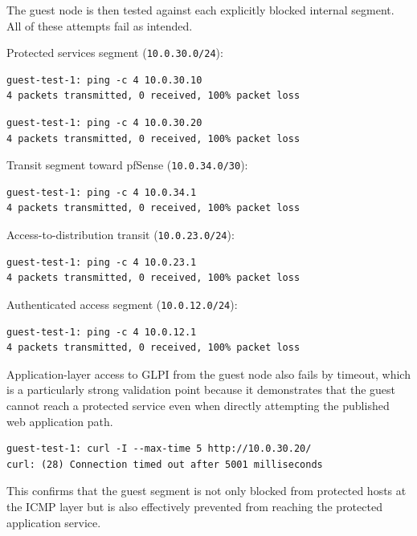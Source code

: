 \documentclass[11pt]{article}
\begin{document}
The guest node is then tested against each explicitly blocked internal segment. All of these attempts fail as intended.

Protected services segment (\texttt{10.0.30.0/24}):

\begin{verbatim}
guest-test-1: ping -c 4 10.0.30.10
4 packets transmitted, 0 received, 100% packet loss
\end{verbatim}

\begin{verbatim}
guest-test-1: ping -c 4 10.0.30.20
4 packets transmitted, 0 received, 100% packet loss
\end{verbatim}

Transit segment toward pfSense (\texttt{10.0.34.0/30}):

\begin{verbatim}
guest-test-1: ping -c 4 10.0.34.1
4 packets transmitted, 0 received, 100% packet loss
\end{verbatim}

Access-to-distribution transit (\texttt{10.0.23.0/24}):

\begin{verbatim}
guest-test-1: ping -c 4 10.0.23.1
4 packets transmitted, 0 received, 100% packet loss
\end{verbatim}

Authenticated access segment (\texttt{10.0.12.0/24}):

\begin{verbatim}
guest-test-1: ping -c 4 10.0.12.1
4 packets transmitted, 0 received, 100% packet loss
\end{verbatim}

Application-layer access to GLPI from the guest node also fails by timeout, which is a particularly strong validation point because it demonstrates that the guest cannot reach a protected service even when directly attempting the published web application path.

\begin{verbatim}
guest-test-1: curl -I --max-time 5 http://10.0.30.20/
curl: (28) Connection timed out after 5001 milliseconds
\end{verbatim}

This confirms that the guest segment is not only blocked from protected hosts at the ICMP layer but is also effectively prevented from reaching the protected application service.

\end{document}

